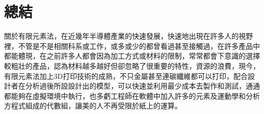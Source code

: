 \chapter{總結}
關於有限元素法，在近幾年半導體產業的快速發展，快速地出現在許多人的視野裡，不管是不是相關科系或工作，或多或少的都曾看過甚至接觸過，在許多產品中都能體現，在之前許多人都會因為加工方式或材料的限制，常常都會下意識的選擇較粗壯的產品，認為材料越多越好但卻忽略了很重要的特性，資源的浪費，現今，有限元素法加上3D打印技術的成熟，不只金屬甚至連碳纖維都可以打印，配合設計者在分析過後所設設計出的模型，可以快速並利用最少成本去製作和測試，通通都能夠在虛擬環境中執行，也多虧工程師在軟體中加入許多的元素及運動學和分析方程式組成的代數組，讓美的人不再受限於紙上的運算。
\newpage
